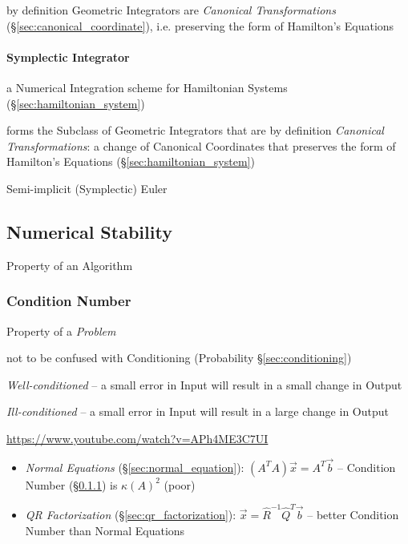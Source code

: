 by definition Geometric Integrators are \emph{Canonical Transformations}
(\S\ref{sec:canonical_coordinate}), i.e. preserving the form of Hamilton's
Equations



\paragraph{Symplectic Integrator}\label{sec:symplectic_integrator}\hfill

a Numerical Integration scheme for Hamiltonian Systems
(\S\ref{sec:hamiltonian_system})

forms the Subclass of Geometric Integrators that are by definition
\emph{Canonical Transformations}: a change of Canonical Coordinates that
preserves the form of Hamilton's Equations (\S\ref{sec:hamiltonian_system})

Semi-implicit (Symplectic) Euler



\subsection{Numerical Stability}\label{sec:numerical_stability}

Property of an Algorithm



\subsubsection{Condition Number}\label{sec:condition_number}

Property of a \emph{Problem}

\fist not to be confused with Conditioning (Probability
\S\ref{sec:conditioning})

\emph{Well-conditioned} -- a small error in Input will result in a small change
in Output

\emph{Ill-conditioned} -- a small error in Input will result in a large change
in Output

\url{https://www.youtube.com/watch?v=APh4ME3C7UI}

\begin{itemize}
  \item \emph{Normal Equations} (\S\ref{sec:normal_equation}): $(A^TA)\vec{x} =
    A^T\vec{b}$ -- Condition Number (\S\ref{sec:condition_number}) is
    $\kappa(A)^2$ (poor)
  \item \emph{QR Factorization} (\S\ref{sec:qr_factorization}): $\vec{x} =
    \hat{R}^{-1}\hat{Q}^T\vec{b}$ -- better Condition Number than Normal
    Equations
\end{itemize}



